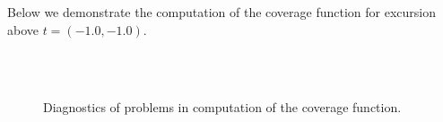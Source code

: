 \documentclass[a4paper,10pt]{article}
\begin{document}
Below we demonstrate the computation of the coverage function for excursion
above $t=\left(-1.0, -1.0\right)$.
\begin{figure}[tbh!p]
\centering
{}\\
\\
\caption{Diagnostics of problems in computation of the coverage function.}
\label{fig:example_inv_prob}
\end{figure}
\end{document}
